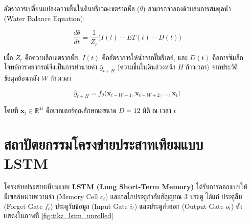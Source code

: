 อัตราการเปลี่ยนแปลงความชื้นในดินบริเวณเขตรากพืช ($\theta$) สามารถจำลองด้วยสมการสมดุลน้ำ (Water Balance Equation):

\begin{equation}
    \frac{d\theta}{dt} = \frac{1}{Z_r} \Big( I(t) - ET(t) - D(t) \Big)
    \label{eq:water_balance}
\end{equation}

เมื่อ $Z_r$ คือความลึกเขตรากพืช, $I(t)$ คืออัตราการให้น้ำจากปั๊มรีเลย์, และ $D(t)$ คือการซึมลึก โจทย์การพยากรณ์จึงเป็นการทำนายค่า $\hat{y}_{t+H}$ (ความชื้นในดินล่วงหน้า $H$ ก้าวเวลา) จากประวัติข้อมูลย้อนหลัง $W$ ก้าวเวลา

\begin{equation}
    \hat{y}_{t+H} = f_\theta\Big( \mathbf{x}_{t-W+1}, \mathbf{x}_{t-W+2}, \dots, \mathbf{x}_t \Big)
    \label{eq:multivariate_forecasting}
\end{equation}

โดยที่ $\mathbf{x}_t \in \mathbb{R}^D$ คือเวกเตอร์คุณลักษณะขนาด $D=12$ มิติ ณ เวลา $t$

\section{สถาปัตยกรรมโครงข่ายประสาทเทียมแบบ LSTM}

โครงข่ายประสาทเทียมแบบ \textbf{LSTM (Long Short-Term Memory)} ได้รับการออกแบบให้มีเซลล์หน่วยความจำ (Memory Cell $c_t$) และกลไกประตูกำกับสัญญาณ 3 ประตู ได้แก่ ประตูลืม (Forget Gate $f_t$) ประตูรับข้อมูล (Input Gate $i_t$) และประตูส่งออก (Output Gate $o_t$) ดังแสดงในภาพที่ \ref{fig:tikz_lstm_unrolled}

